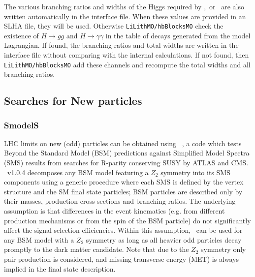 \documentclass[12pt,a4paper]{article}
\begin{document}
{The various branching ratios and widths of the Higgs required by   \HB,\HS\ or  \lilith\ are also written automatically in the interface file. When these 
values  are provided in an SLHA file, they will be used. Otherwise {\tt LiLithMO/hbBlocksMO}  check  the existence
of $H\rightarrow gg$  and $H\rightarrow \gamma\gamma$  in the table of decays generated from the model Lagrangian. If found, the branching ratios and total widths are written in the  interface file without comparing  with the internal calculations. If not found, then {\tt LiLithMO/hbBlocksMO} add these channels and  recompute the total widths and all branching ratios.




\subsection{Searches for New particles}

\subsubsection{SmodelS}
LHC limits on new (odd) particles can be obtained using \smodels~\cite{Kraml:2013mwa,Kraml:2014sna}, 
a code which tests Beyond the Standard Model (BSM) predictions against Simplified Model Spectra (SMS) results from searches 
for R-parity conserving SUSY by ATLAS and CMS.
\smodels~v1.0.4 decomposes any BSM model featuring a ${Z}_2$ symmetry into its SMS components 
using a generic procedure where each SMS is defined by the vertex structure and the SM final state particles; BSM particles are described only by their masses, production cross sections and branching ratios. 
The underlying assumption is that differences in the event kinematics (e.g. from different production mechanisms or from the spin of the BSM particle) do not significantly affect the signal selection efficiencies. 
Within this assumption, \smodels\ can be used for any BSM model with a ${Z}_2$ symmetry as long as all heavier odd particles decay promptly to the dark matter candidate. Note that due to the ${Z}_2$ symmetry only pair production is considered, and missing transverse energy (MET) is always implied in the final state description.




}
\end{document}
